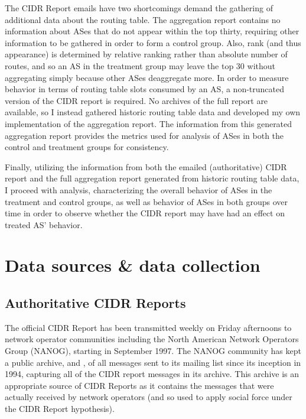 The CIDR Report emails have two shortcomings demand the gathering of additional data about the routing table. The aggregation report contains no information about ASes that do not appear within the top thirty, requiring other information to be gathered in order to form a control group. Also, rank (and thus appearance) is determined by relative ranking rather than absolute number of routes, and so an AS in the treatment group may leave the top 30 without aggregating simply because other ASes deaggregate more. In order to measure behavior in terms of routing table slots consumed by an AS, a non-truncated version of the CIDR report is required. No archives of the full report are available, so I instead gathered historic routing table data and developed my own implementation of the aggregation report. The information from this generated aggregation report provides the metrics used for analysis of ASes in both the control and treatment groups for consistency.

Finally, utilizing the information from both the emailed (authoritative) CIDR report and the full aggregation report generated from historic routing table data, I proceed with analysis, characterizing the overall behavior of ASes in the treatment and control groups, as well as behavior of ASes in both groups over time in order to observe whether the CIDR report may have had an effect on treated AS' behavior.

\section{Data sources \& data collection} %

\subsection{Authoritative CIDR Reports}

The official CIDR Report has been transmitted weekly on Friday afternoons to network operator communities including the North American Network Operators Group (NANOG), starting in September 1997. The NANOG community has kept a public archive, \cite{NANOG} and \cite{NANOG-new}, of all messages sent to its mailing list since its inception in 1994, capturing all of the CIDR report messages in its archive. This archive is an appropriate source of CIDR Reports as it contains the messages that were actually received by network operators (and so used to apply social force under the CIDR Report hypothesis).

